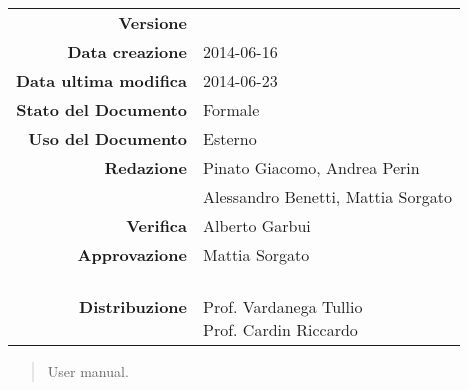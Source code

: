 


\newcommand{\Versione}{\versioneManualeUtente{}} %
\newcommand{\Data}{2014-06-16}				     %
\newcommand{\DataUltimaModifica}{2014-06-23}
\newcommand{\TipoDocumento}{User Manual}	 	%



\begin{center}
\begin{tabular}{r|l}
\textbf{Versione} & \Versione{} \\
\textbf{Data creazione} & \Data{} \\
\textbf{Data ultima modifica} & \DataUltimaModifica{} \\
\textbf{Stato del Documento} & Formale \\		          %
\textbf{Uso del Documento} & Esterno \\			          %
\textbf{Redazione} &  Pinato Giacomo, Andrea Perin\\
& Alessandro Benetti, Mattia Sorgato\\
\textbf{Verifica} & Alberto Garbui\\  %
\textbf{Approvazione} & Mattia Sorgato\\				      %
\textbf{Distribuzione} & \parbox[t]{4cm}{\NomeGruppo{}\\Prof. Vardanega Tullio\\Prof. Cardin Riccardo\\ \Prop{} }\\
\end{tabular}
\end{center}

\vspace{0.05in}

\begin{abstract}
\begin{center}
\Progetto{} User manual.
\end{center}
\end{abstract}

